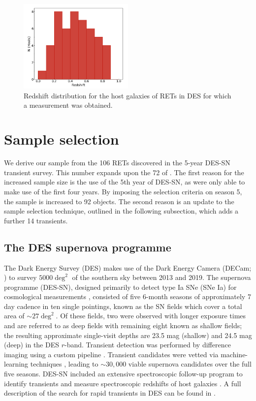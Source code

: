 \documentclass[fleqn,usenatbib,]{mnras}
\begin{document}
\begin{figure}
\includegraphics[width=0.5\textwidth]{figs/z_dist.png}
\caption{Redshift distribution for the host galaxies of RETs in DES for which a measurement was obtained.
\label{fig:z_dist}}
\end{figure}

\section{Sample selection}
\label{sec:sample}
We derive our sample from the 106 RETs discovered in the 5-year DES-SN transient survey. This number expands upon the 72 of . The first reason for the increased sample size is the use of the 5th year of DES-SN, as  were only able to make use of the first four years. By imposing the  selection criteria on season 5, the sample is increased to 92 objects. The second reason is an update to the sample selection technique, outlined in the following subsection, which adds a further 14 transients.

\subsection{The DES supernova programme \label{subsec:desdata}}

The Dark Energy Survey (DES) makes use of the Dark Energy Camera (DECam; \citealt{Flaugher2015}) to survey $5000\deg^2$ of the southern sky between 2013 and 2019. The supernova programme (DES-SN), designed primarily to detect type Ia SNe (SNe Ia) for cosmological measurements \citep{Bernstein2012}, consisted of five 6-month seasons of approximately 7 day cadence in ten single pointings, known as the SN fields which cover a total area of $\sim27 \deg^2$. Of these fields, two were observed with longer exposure times and are referred to as deep fields with remaining eight known as shallow fields; the resulting approximate single-visit depths are 23.5 mag (shallow) and 24.5 mag (deep) in the DES $r$-band. Transient detection was performed by difference imaging using a custom pipeline \citep{Kessler2015}. Transient candidates were vetted via machine-learning techniques \citep{Goldstein2015}, leading to $\sim 30,000$ viable supernova candidates over the full five seasons. DES-SN included an extensive spectroscopic follow-up program to identify transients and measure spectroscopic redshifts of host galaxies \citep{DAndrea2018}. A full description of the search for rapid transients in DES can be found in .
\end{document}
